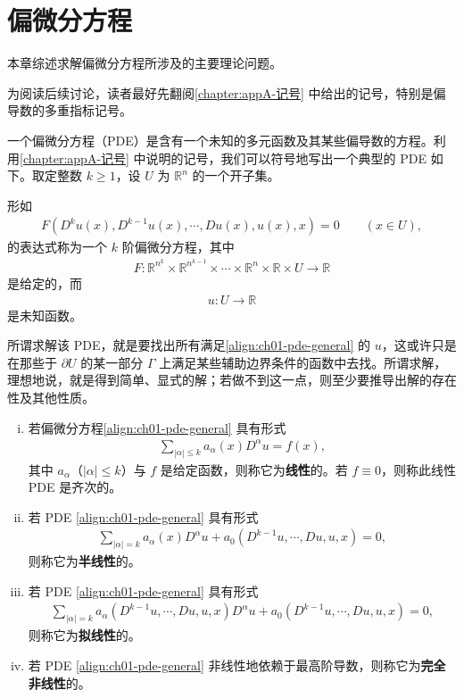 \documentclass[../../main.tex]{subfiles}
\begin{document}
\section{偏微分方程}\label{section:ch01-pde}

本章综述求解偏微分方程所涉及的主要理论问题。

为阅读后续讨论，读者最好先翻阅\cref{chapter:appA-记号} 中给出的记号，特别是偏导数的多重指标记号。

一个偏微分方程（PDE）是含有一个未知的多元函数及其某些偏导数的方程。利用\cref{chapter:appA-记号} 中说明的记号，我们可以符号地写出一个典型的 PDE 如下。取定整数 $k\geqslant 1$，设 $U$ 为 $\mathbb{R}^n$ 的一个开子集。

\begin{definition}\label{definition:ch01-k阶pde}
形如
\begin{align}\label{align:ch01-pde-general}
F(D^k u(x), D^{k-1}u(x), \cdots, Du(x), u(x), x)=0 \qquad (x\in U),
\end{align}
的表达式称为一个 $k$ 阶偏微分方程，其中
\begin{align*}
F:\mathbb{R}^{n^k}\times\mathbb{R}^{n^{k-1}}\times\cdots\times\mathbb{R}^n\times\mathbb{R}\times U\to\mathbb{R}
\end{align*}
是给定的，而
\begin{align*}
u:U\to\mathbb{R}
\end{align*}
是未知函数。
\end{definition}

所谓求解该 PDE，就是要找出所有满足\eqref{align:ch01-pde-general} 的 $u$，这或许只是在那些于 $\partial U$ 的某一部分 $\Gamma$ 上满足某些辅助边界条件的函数中去找。所谓求解，理想地说，就是得到简单、显式的解；若做不到这一点，则至少要推导出解的存在性及其他性质。

\begin{definition}\label{definition:ch01-方程分类}
\begin{enumerate}[(i)]
\item 若偏微分方程\eqref{align:ch01-pde-general} 具有形式
\begin{align*}
\sum_{|\alpha|\leqslant k} a_\alpha(x) D^\alpha u = f(x),
\end{align*}
其中 $a_\alpha$（$|\alpha|\leqslant k$）与 $f$ 是给定函数，则称它为\textbf{线性}的。若 $f\equiv 0$，则称此线性 PDE 是齐次的。
\item 若 PDE \eqref{align:ch01-pde-general} 具有形式
\begin{align*}
\sum_{|\alpha|=k} a_\alpha(x) D^\alpha u + a_0(D^{k-1}u, \cdots, Du, u, x)=0,
\end{align*}
则称它为\textbf{半线性}的。
\item 若 PDE \eqref{align:ch01-pde-general} 具有形式
\begin{align*}
\sum_{|\alpha|=k} a_\alpha(D^{k-1}u, \cdots, Du, u, x) D^\alpha u + a_0(D^{k-1}u, \cdots, Du, u, x)=0,
\end{align*}
则称它为\textbf{拟线性}的。
\item 若 PDE \eqref{align:ch01-pde-general} 非线性地依赖于最高阶导数，则称它为\textbf{完全非线性}的。
\end{enumerate}
\end{definition}
\end{document}
